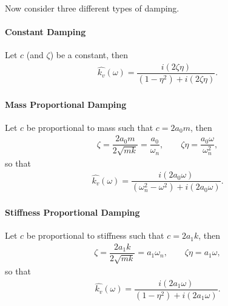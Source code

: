 Now consider three different types of damping.
\paragraph{Constant Damping}
Let $c$ (and $\zeta$) be a constant, then
\begin{gather}\label{eq:damping_constant}
\hat{k_v}\left(\omega\right)=\dfrac{i\left(2\zeta\eta\right)}{\left(1-\eta^2\right)+i\left(2\zeta\eta\right)}.
\end{gather}
\paragraph{Mass Proportional Damping}
Let $c$ be proportional to mass such that $c=2a_0m$, then
\begin{gather}
\zeta=\dfrac{2a_0m}{2\sqrt{mk}}=\dfrac{a_0}{\omega_n},\qquad
\zeta\eta=\dfrac{a_0\omega}{\omega_n^2},
\end{gather}
so that
\begin{gather}\label{eq:damping_mass}
\hat{k_v}\left(\omega\right)=\dfrac{i\left(2a_0\omega\right)}{\left(\omega_n^2-\omega^2\right)+i\left(2a_0\omega\right)}.
\end{gather}
\paragraph{Stiffness Proportional Damping}
Let $c$ be proportional to stiffness such that $c=2a_1k$, then
\begin{gather}
\zeta=\dfrac{2a_1k}{2\sqrt{mk}}=a_1\omega_n,\qquad
\zeta\eta=a_1\omega,
\end{gather}
so that
\begin{gather}\label{eq:damping_stiffness}
\hat{k_v}\left(\omega\right)=\dfrac{i\left(2a_1\omega\right)}{\left(1-\eta^2\right)+i\left(2a_1\omega\right)}.
\end{gather}

